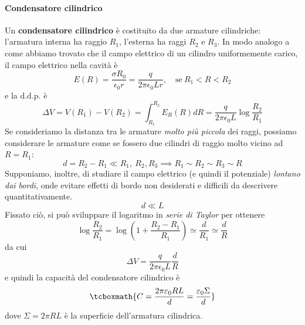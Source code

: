 \paragraph{Condensatore cilindrico}
Un \textbf{condensatore cilindrico} è costituito da due armature cilindriche: l'armatura interna ha raggio $R_1$, l'esterna ha raggi $R_2$ e $R_3$.
In modo analogo a come abbiamo trovato che il campo elettrico di un cilindro uniformemente carico, %
il campo elettrico nella cavità è
\begin{equation*}
	E(R)=\frac{\sigma R_0}{\epsilon_0r}=\frac{q}{2\pi\epsilon_0Lr},\quad\text{se}\ R_1<R<R_2
\end{equation*}
e la $\textrm{d.d.p.}$ è
\begin{equation*}
	\Delta V=V(R_1)-V(R_2)=\int_{R_1}^{R_2}E_R(R)dR=\frac{q}{2\pi\epsilon_0L}\log\frac{R_2}{R_1}
\end{equation*}
Se consideriamo la distanza tra le armature \textit{molto più piccola} dei raggi, possiamo considerare le armature come se fossero due cilindri di raggio molto vicino ad $R=R_1$:
\begin{equation*}
	d=R_2-R_1\ll R_1,\ R_2, R_3\implies R_1\sim R_2\sim R_3\sim R
\end{equation*}
Supponiamo, inoltre, di studiare il campo elettrico (e quindi il potenziale) \textit{lontano dai bordi}, onde evitare effetti di bordo non desiderati e difficili da descrivere quantitativamente.
\begin{equation*}
	d\ll L
\end{equation*}
Fissato ciò, si può sviluppare il logaritmo in \textit{serie di Taylor} per ottenere
\begin{equation*}
	\log\frac{R_2}{R_1}=\log\left(1+\frac{R_2-R_1}{R_1}\right)\simeq\frac{d}{R_1}\simeq\frac{d}{R}
\end{equation*}
da cui
\begin{equation*}
	\Delta V=\frac{q}{2\pi\epsilon_0L}\frac{d}{R}
\end{equation*}
e quindi la capacità del condensatore cilindrico è
\begin{equation}
	\tcboxmath{C=\frac{2\pi\epsilon_0RL}{d}=\frac{\epsilon_0\Sigma}{d}}
\end{equation}
dove $\Sigma=2\pi RL$ è la superficie dell'armatura cilindrica.
